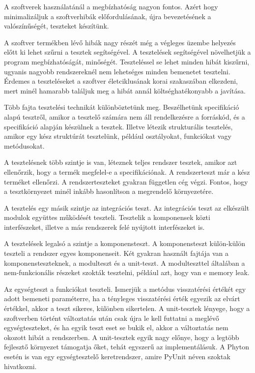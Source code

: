 
A szoftverek használatánál a megbízhatóság nagyon fontos. Azért hogy minimalizáljuk a szoftverhibák előfordulásának, újra bevezetésének a valószínűségét, teszteket készítünk.

A szoftver termékben lévő hibák nagy részét még a végleges üzembe helyezés előtt ki lehet szűrni a tesztek segítségével. A tesztelések segítségével növelhetjük a program megbízhatóságát, minőségét. Teszteléssel se lehet minden hibát kiszűrni, ugyanis nagyobb rendszereknél nem lehetséges minden bemenetet tesztelni. Érdemes a teszteléseket a szoftver életciklusának korai szakaszában elkezdeni, mert minél hamarabb találjuk meg a hibát annál költséghatékonyabb a javítása.

Több fajta tesztelési technikát különböztetünk meg. Beszélhetünk specifikáció alapú tesztről, amikor a tesztelő számára nem áll rendelkezésre a forráskód, és a specifikáció alapján készülnek a tesztek. Illetve létezik strukturális tesztelés, amikor egy kész struktúrát tesztelünk, például osztályokat, funkciókat vagy metódusokat.


A tesztelésnek több szintje is van, léteznek teljes rendszer tesztek,	 amikor azt ellenőrzik, hogy a termék megfelel-e a specifikációnak. A rendszerteszt már a kész terméket ellenőrzi. A rendszerteszteket gyakran független cég végzi. Fontos, hogy a tesztkörnyezet minél inkább hasonlítson a megrendelő környezetére.

A tesztelés egy másik szintje az integrációs teszt. Az integrációs teszt az elkészült modulok együttes működését teszteli. Tesztelik a komponensek közti interfészeket, illetve a más rendszerek felé nyújtott interfészeket is.

A tesztelések legalsó a szintje a komponensteszt. A komponensteszt külön-külön teszteli a rendszer egyes komponenseit. Két gyakran használt fajtája van a komponensteszteknek, a modulteszt és a unit-teszt. A modulteszttel általában a nem-funkcionális részeket szokták tesztelni, például azt, hogy van e memory leak.


Az egységteszt a funkciókat teszteli. Ismerjük a metódus visszatérési értékét egy adott bemeneti paraméterre, ha a tényleges visszatérési érték egyezik az elvárt értékkel, akkor a teszt sikeres, különben sikertelen. A unit-tesztek lényege, hogy a szoftverben történt változtatás után csak újra le kell futtatni a meglévő egységteszteket, és ha egyik teszt eset se bukik el, akkor a változtatás nem okozott hibát a rendszerben.
A unit-tesztek egyik nagy előnye, hogy a legtöbb fejlesztő környezet támogatja őket, tehát egyszerű az implementálásuk. A Phyton esetén is van egy egységtesztelő keretrendszer, amire PyUnit néven szoktak hivatkozni.

